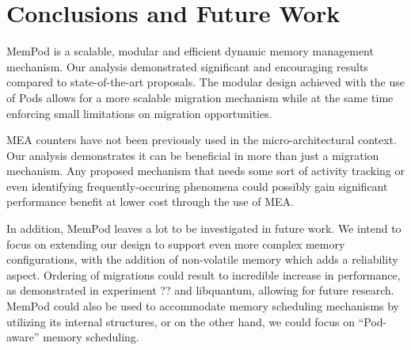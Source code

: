 \section{Conclusions and Future Work}
\label{sec:Conclusions}

MemPod is a scalable, modular and efficient dynamic memory management mechanism. Our analysis demonstrated significant and encouraging results compared to state-of-the-art proposals. The modular design achieved with the use of Pods allows for a more scalable migration mechanism while at the same time enforcing small limitations on migration opportunities.

MEA counters have not been previously used in the micro-architectural context. Our analysis demonstrates it can be beneficial in more than just a migration mechanism. Any proposed mechanism that needs some sort of activity tracking or even identifying frequently-occuring phenomena could possibly gain significant performance benefit at lower cost through the use of MEA.

In addition, MemPod leaves a lot to be investigated in future work. We intend to focus on extending our design to support even more complex memory configurations, with the addition of non-volatile memory which adds a reliability aspect. Ordering of migrations could result to incredible increase in performance, as demonstrated in experiment ?? and libquantum, allowing for future research. MemPod could also be used to accommodate memory scheduling mechanisms by utilizing its internal structures, or on the other hand, we could focus on ``Pod-aware'' memory scheduling.
